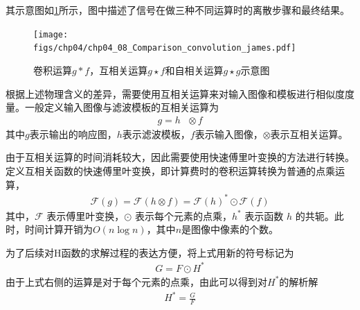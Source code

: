 其示意图如\ref{fig:chp04_08_Comparison_convolution_james}\cite{wiki_cross_correlation}所示，图中描述了信号在做三种不同运算时的离散步骤和最终结果。
\begin{figure}[ht]   
	\centering
	\texttt{[image: figs/chp04/chp04\_08\_Comparison\_convolution\_james.pdf]}
	\caption{卷积运算$g*f$，互相关运算$g \star f$和自相关运算$g \star g$示意图}
	\label{fig:chp04_08_Comparison_convolution_james}
\end{figure}

根据上述物理含义的差异，需要使用互相关运算来对输入图像和模板进行相似度度量。一般定义输入图像与滤波模板的互相关运算为
\begin{align}
g=h\text{ }\otimes  f  
\end{align}
其中$g$表示输出的响应图，$h$表示滤波模板，$f$表示输入图像，$\otimes$表示互相关运算。

由于互相关运算的时间消耗较大，因此需要使用快速傅里叶变换的方法进行转换。定义互相关函数的快速傅里叶变换，即计算费时的卷积运算转换为普通的点乘运算，
\begin{align}
\mathcal{F}(g) = \mathcal{F}(h\otimes f)={{\mathcal{F}(h)}^{*}}\odot \mathcal{F}(f )
\end{align}
其中，$\mathcal{F}$ 表示傅里叶变换，$\odot$ 表示每个元素的点乘，$h^*$ 表示函数 $h$ 的共轭。此时，时间计算开销为$O(n\log n)$，其中$n$是图像中像素的个数。

为了后续对H函数的求解过程的表达方便，将上式用新的符号标记为
\begin{align}
G=F\odot H^*
\end{align}
由于上式右侧的运算是对于每个元素的点乘，由此可以得到对$H^*$的解析解
\begin{align}
H^* = \frac{G}{F}
\end{align}

